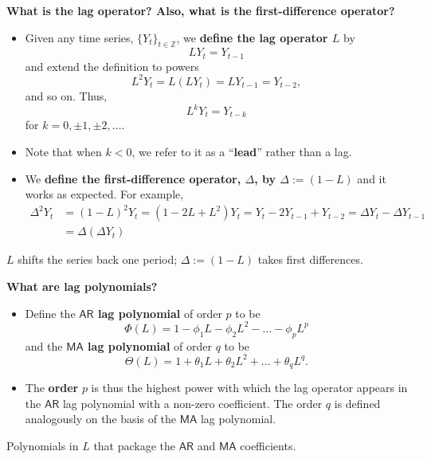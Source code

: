 \documentclass[
  letterpaper,
  DIV=11,
  numbers=noendperiod]{scrartcl}
\newcommand{\slidelabel}[1]{{\color{embernavy}\bfseries\large #1\par\vspace{5pt}}}
\newenvironment{slidefooter}{%
  \par\vspace{7pt}{\color{emberrule}\rule{\linewidth}{0.4pt}}\par\vspace{4pt}%
  \color{emberamber}\itshape\small}{\par}
\begin{document}
\begin{slidebox}

\slidelabel{What is the lag operator? Also, what is the first-difference
operator?}

\begin{itemize}
\item
  Given any time series, \(\{Y_t\}_{t \in \mathbb{Z}}\), we
  \textbf{define the lag operator \(L\)} by \[LY_t = Y_{t-1}\] and
  extend the definition to powers
  \[L^2 Y_t = L(LY_t) = LY_{t-1} = Y_{t-2},\] and so on. Thus,
  \[L^k Y_t = Y_{t-k}\] for \(k = 0, \pm 1, \pm 2, \ldots\).
\item
  Note that when \(k < 0\), we refer to it as a ``\textbf{lead}'' rather
  than a lag.
\item
  We \textbf{define the first-difference operator, \(\Delta\), by
  \(\Delta := (1 - L)\)} and it works as expected. For example,
  \[\begin{aligned} \Delta^2 Y_t &= (1 - L)^2 Y_t = (1 - 2L + L^2)Y_t = Y_t - 2Y_{t-1} + Y_{t-2} = \Delta Y_t - \Delta Y_{t-1} \\ &= \Delta(\Delta Y_t) \end{aligned}\]
\end{itemize}

\begin{slidefooter}

\(L\) shifts the series back one period; \(\Delta := (1 - L)\) takes
first differences.

\end{slidefooter}

\end{slidebox}

\begin{slidebox}

\slidelabel{What are lag polynomials?}

\begin{itemize}
\item
  Define the \textbf{\(\mathsf{AR}\) lag polynomial} of order \(p\) to
  be \[\Phi(L) = 1 - \phi_1 L - \phi_2 L^2 - \ldots - \phi_p L^p\] and
  the \textbf{\(\mathsf{MA}\) lag polynomial} of order \(q\) to be
  \[\Theta(L) = 1 + \theta_1 L + \theta_2 L^2 + \ldots + \theta_q L^q.\]
\item
  The \textbf{order} \(p\) is thus the highest power with which the lag
  operator appears in the \(\mathsf{AR}\) lag polynomial with a non-zero
  coefficient. The order \(q\) is defined analogously on the basis of
  the \(\mathsf{MA}\) lag polynomial.
\end{itemize}

\begin{slidefooter}

Polynomials in \(L\) that package the \(\mathsf{AR}\) and
\(\mathsf{MA}\) coefficients.

\end{slidefooter}

\end{slidebox}
\end{document}
